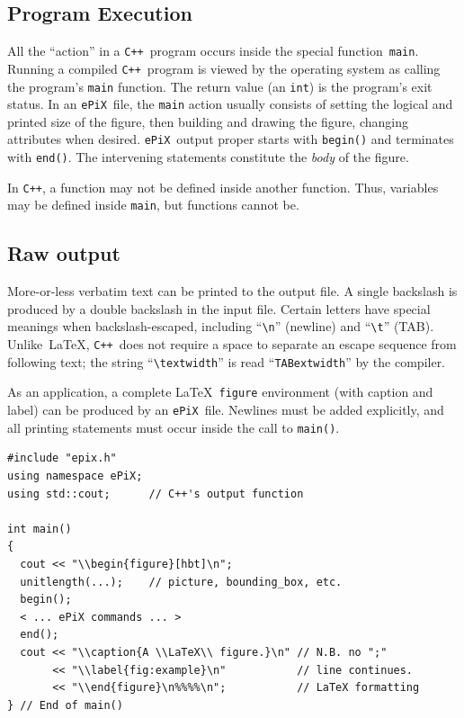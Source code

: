 \documentclass[12pt]{report}
\newcommand{\code}[1]{\texttt{#1}}
\newcommand{\ePiX}{\code{ePiX}}
\newcommand{\CXX}{\code{C++}}
\begin{document}
\subsection*{Program Execution}

All the ``action'' in a \CXX\ program occurs inside the special
function~\code{main}. Running a compiled \CXX~program is viewed by the
operating system as calling the program's \code{main} function. The
return value (an \code{int}) is the program's exit status.  In an
\ePiX\ file, the \code{main} action usually consists of setting the
logical and printed size of the figure, then building and drawing the
figure, changing attributes when desired.  \ePiX\ output proper starts
with \code{begin()} and terminates with \code{end()}. The intervening
statements constitute the \emph{body} of the figure.

In \CXX, a function may not be defined inside another function. Thus,
variables may be defined inside \code{main}, but functions cannot be.


\subsection*{Raw output} 

More-or-less verbatim text can be printed to the output file.  A
single backslash is produced by a double backslash in the input file.
Certain letters have special meanings when backslash-escaped,
including ``\verb+\n+'' (newline) and ``\verb+\t+'' (TAB).
Unlike~\LaTeX, \CXX~does not require a space to separate an escape
sequence from following text; the string ``\verb+\textwidth+'' is read
``\code{TABextwidth}'' by the compiler.

As an application, a complete \LaTeX\ \code{figure} environment (with
caption and label) can be produced by an \ePiX\ file. Newlines must be
added explicitly, and all printing statements must occur inside the
call to \code{main()}.
\begin{verbatim}
#include "epix.h"
using namespace ePiX;
using std::cout;      // C++'s output function

int main() 
{
  cout << "\\begin{figure}[hbt]\n";
  unitlength(...);    // picture, bounding_box, etc.
  begin();
  < ... ePiX commands ... >
  end();
  cout << "\\caption{A \\LaTeX\\ figure.}\n" // N.B. no ";"
       << "\\label{fig:example}\n"           // line continues.
       << "\\end{figure}\n%%%%\n";           // LaTeX formatting
} // End of main()
\end{verbatim}
\end{document}
